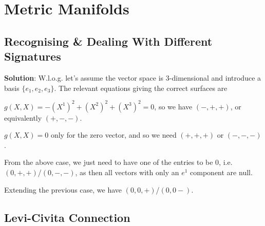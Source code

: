 \setcounter{section}{9}

\section{Metric Manifolds}

\subsection{Recognising \& Dealing With Different Signatures}


\textbf{Solution}: W.l.o.g. let's assume the vector space is 3-dimensional and introduce a basis $\{e_1,e_2,e_3\}$. The relevant equations giving the correct surfaces are
\benr 
    \item $g(X,X) = -(X^1)^2 + (X^2)^2 + (X^3)^2 = 0$, so we have $(-,+,+)$, or equivalently $(+,-,-)$.
    \item $g(X,X)=0$ only for the zero vector, and so we need $(+,+,+)$ or $(-,-,-)$. 
    \item From the above case, we just need to have one of the entries to be 0, i.e. $(0,+,+)$/$(0,-,-)$, as then all vectors with only an $e^1$ component are null. 
    \item Extending the previous case, we have $(0,0,+)$/$(0,0-)$.
\een 

\subsection{Levi-Civita Connection}


